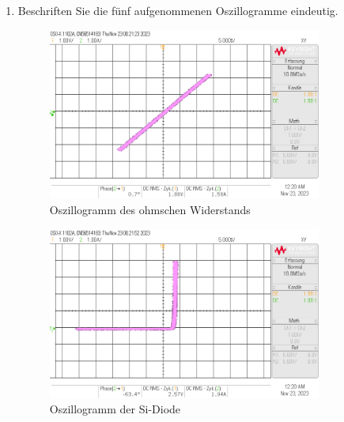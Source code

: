 \begin{enumerate}[label=\alph*)]
	\item Beschriften Sie die fünf aufgenommenen Oszillogramme eindeutig.

	      \begin{figure}[h!]
		      \begin{center}
			      \includegraphics[width=0.85\textwidth]{img/V1/3.2.Widerstand.png}
			      \caption{Oszillogramm des ohmschen Widerstands}
		      \end{center}
	      \end{figure}

	      \pagebreak
	      \begin{figure}[h!]
		      \begin{center}
			      \includegraphics[width=0.85\textwidth]{img/V1/3.2.Diode_Si.png}
			      \caption{Oszillogramm der Si-Diode}
		      \end{center}
	      \end{figure}


\end{enumerate}
